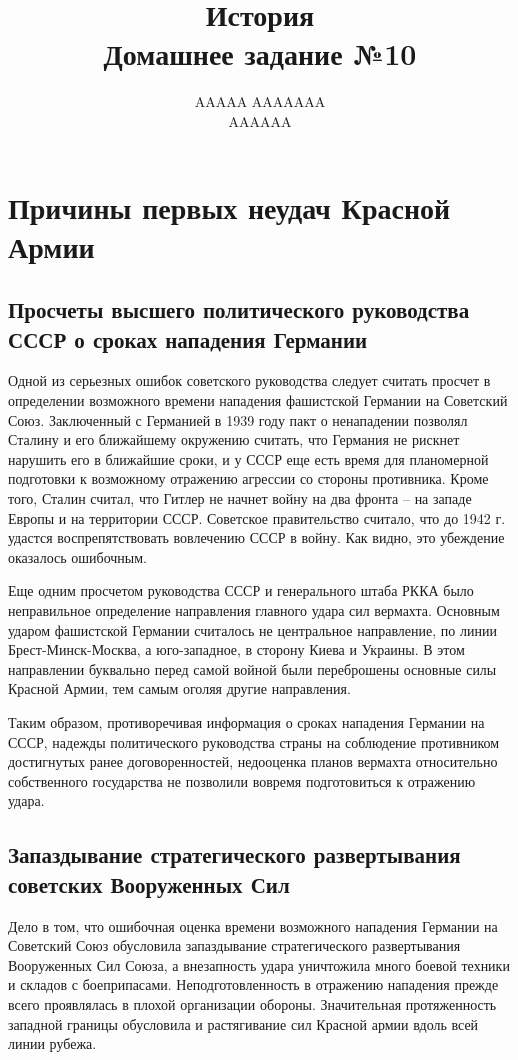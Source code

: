 \documentclass[12pt]{article}
\title{История \\ Домашнее задание №10}
\author{AAAAA AAAAAAA \\ AAAAAA}
\begin{document}
  \maketitle

  \setcounter{section}{1}
  \section{Причины первых неудач Красной Армии}
  \subsection{Просчеты высшего политического руководства СССР о сроках нападения Германии}
  Одной из серьезных ошибок советского руководства следует считать просчет
  в определении возможного времени нападения фашистской Германии на Советский Союз.
  Заключенный с Германией в 1939 году пакт о ненападении позволял Сталину и его ближайшему окружению считать,
  что Германия не рискнет нарушить его в ближайшие сроки,
  и у СССР еще есть время для планомерной подготовки к возможному отражению агрессии со стороны противника.
  Кроме того, Сталин считал, что Гитлер не начнет войну на два фронта -- на западе Европы и на территории СССР.
  Советское правительство считало, что до 1942 г. удастся воспрепятствовать вовлечению СССР в войну.
  Как видно, это убеждение оказалось ошибочным.

  Еще одним просчетом руководства СССР и генерального штаба РККА было неправильное определение направления главного удара сил вермахта.
  Основным ударом фашистской Германии считалось не центральное направление, по линии Брест-Минск-Москва,
  а юго-западное, в сторону Киева и Украины.
  В этом направлении буквально перед самой войной были переброшены основные силы Красной Армии, тем самым оголяя другие направления.

  Таким образом, противоречивая информация о сроках нападения Германии на СССР, надежды политического руководства страны на соблюдение противником достигнутых ранее договоренностей, недооценка планов вермахта относительно собственного государства не позволили вовремя подготовиться к отражению удара.

  \subsection{Запаздывание стратегического развертывания советских Вооруженных Сил}
  Дело в том, что ошибочная оценка времени возможного нападения Германии на Советский Союз обусловила запаздывание стратегического развертывания Вооруженных Сил Союза, а внезапность удара уничтожила много боевой техники и складов с боеприпасами.
  Неподготовленность в отражению нападения прежде всего проявлялась в плохой организации обороны.
  Значительная протяженность западной границы обусловила и растягивание сил Красной армии вдоль всей линии рубежа.
\end{document}
